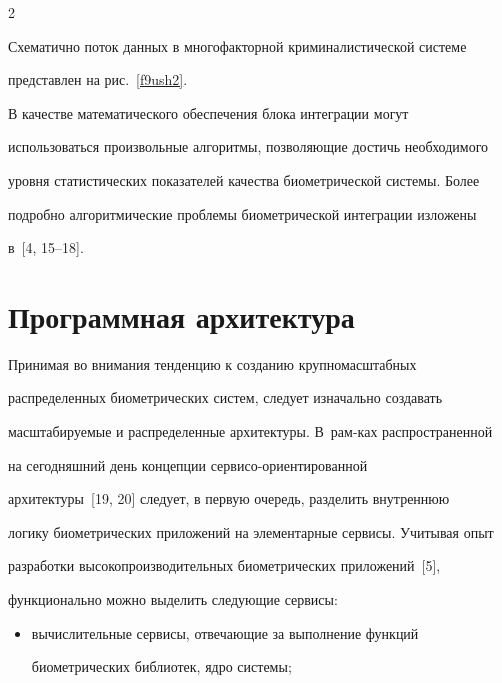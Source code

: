 \begin{multicols}{2}  



  Схематично поток данных в многофакторной криминалистической системе 

представлен на рис.~\ref{f9ush2}. 

  

 

  В качестве математического обеспечения блока интеграции могут 

использоваться произвольные алгоритмы, позволяющие достичь необходимого 

уровня статистических показателей качества биометрической системы. Более 

подробно алгоритмические проблемы биометрической интеграции изложены 

в~[4, 15--18].

  

\vspace*{-6pt}

  \section{Программная архитектура}

  

  Принимая во внимания тенденцию к созданию крупномасштабных 

распределенных био\-мет\-ри\-че\-ских систем, следует изначально создавать 

масштабируемые и распределенные архитектуры. В~рам-\linebreak ках распространенной 

на сегодняшний день концепции сер\-ви\-со-ори\-ен\-ти\-ро\-ван\-ной 

  архитектуры~[19, 20] следует, в первую очередь, разделить внутреннюю 

логику биометрических приложений на элементарные сервисы. Учитывая опыт 

разработки высо\-ко\-про\-из\-во\-ди\-тель\-ных биометрических приложений~[5], 

функционально можно выделить сле\-ду\-ющие сервисы:

\begin{itemize}

\item вычислительные сервисы, отвечающие за выполнение функций 

биометрических библиотек, ядро системы;


\end{itemize}
\end{multicols}
